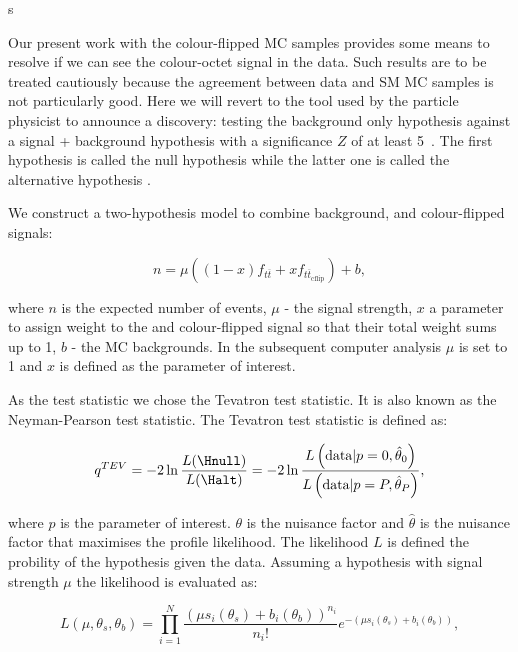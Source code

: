 s\label{subsec:hypo_testing}

Our present work with the colour-flipped MC samples provides some means to resolve if we can see the colour-octet \PW signal in the data. Such results are to be treated cautiously because the agreement between data and SM MC samples is not particularly good. Here we will revert to the tool used by the particle physicist to announce a discovery: testing the background only hypothesis against a signal + background hypothesis with a significance $Z$ of at least 5~\cite{Cowan:2010js}. The first hypothesis is called the null hypothesis \Hnull while the latter one is called the alternative hypothesis \Halt.

We construct a two-hypothesis model to combine background, \ttbar and colour-flipped \ttbar signals:

\begin{equation}
  n=\mu\left(\left(1-x\right)f_{t\overline{t}} + xf_{t\overline{t}_{\text{cflip}}}\right) + b,
  \label{eq:two_hypo_model}
\end{equation}

\noindent where $n$ is the expected number of events, $\mu$ - the signal strength, $x$ a parameter to assign weight to the \ttbar and colour-flipped \ttbar signal so that their total weight sums up to 1, $b$ - the MC backgrounds. In the subsequent computer analysis $\mu$ is set to 1 and $x$ is defined as the parameter of interest.

As the test statistic we chose the Tevatron test statistic. It is also known as the Neyman-Pearson test statistic. The Tevatron test statistic is defined as:

\begin{equation}
  q^{TEV}=-2\ln{\frac{L(\Hnull)}{L(\Halt)}}=-2\ln{\frac{L\left(\text{data}|p=0,\hat{\theta}_{0}\right)}{L\left(\text{data}|p=P,\hat{\theta}_{P}\right)}},
\end{equation}

\noindent where $p$ is the parameter of interest. $\theta$ is the nuisance factor and $\hat{\theta}$ is the nuisance factor that maximises the profile likelihood. The likelihood $L$ is defined the probility of the hypothesis given the data. Assuming a hypothesis with signal strength $\mu$ the likelihood is evaluated as:

\begin{equation}
  L(\mu, \theta_{s}, \theta_{b}) = \prod_{i=1}^{N}\frac{(\mu s_{i}(\theta_{s}) + b_{i}(\theta_{b}))^{n_{i}}}{n_{i}!}e^{-(\mu s_{i}(\theta_{s}) + b_{i}(\theta_{b}))},
\end{equation}

